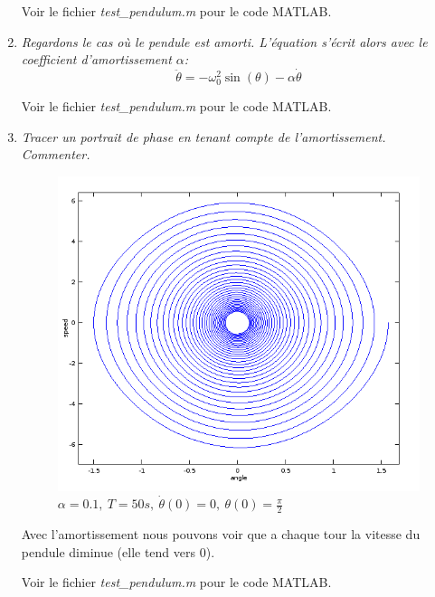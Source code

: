 \documentclass[a4paper,10pt]{article}
\begin{document}
\begin{enumerate}
    Voir le fichier \emph{test\_pendulum.m} pour le code MATLAB.

    \item \emph{Regardons le cas où le pendule est amorti. L'équation s'écrit alors avec
    le coefficient d'amortissement $\alpha$:}
\[
    \ddot{\theta} = -\omega_0^2 \sin(\theta) - \alpha \dot{\theta}
\]

    Voir le fichier \emph{test\_pendulum.m} pour le code MATLAB.
\clearpage
    \item \emph{Tracer un portrait de phase en tenant compte de l'amortissement.
    Commenter.}
\begin{figure}[h!]
    \centering
    \includegraphics[scale=0.5]{./img/pendulum-friction.png}
    \caption{$\alpha = 0.1,~T = 50s,~\dot{\theta}(0) = 0,~\theta(0) = \frac{\pi}{2}$}
\end{figure}

    Avec l'amortissement nous pouvons voir que a chaque tour la vitesse du pendule
    diminue (elle tend vers 0).

    Voir le fichier \emph{test\_pendulum.m} pour le code MATLAB.
\end{enumerate}
\end{document}
